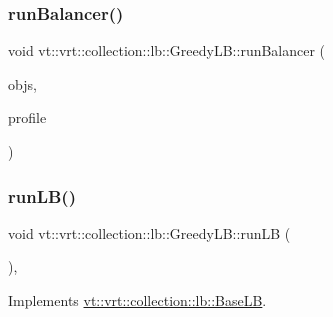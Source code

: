 \subsubsection{\texorpdfstring{run\+Balancer()}{runBalancer()}}
{\footnotesize\ttfamily void vt\+::vrt\+::collection\+::lb\+::\+Greedy\+L\+B\+::run\+Balancer (\begin{DoxyParamCaption}\item[{\hyperlink{structvt_1_1vrt_1_1collection_1_1lb_1_1_base_l_b_a331d7da5bbf2883238427d86b54ddd7b}{Obj\+Sample\+Type} \&\&}]{objs,  }\item[{\hyperlink{structvt_1_1vrt_1_1collection_1_1lb_1_1_greedy_l_b_a3db2c9b36ac99ed4aed38519be4aad60}{Load\+Profile\+Type} \&\&}]{profile }\end{DoxyParamCaption})\hspace{0.3cm}{\ttfamily [private]}}

\mbox{\label{structvt_1_1vrt_1_1collection_1_1lb_1_1_greedy_l_b_ab5e726f6fe7aa749ea6e0e2a45171d36}} 
\subsubsection{\texorpdfstring{run\+L\+B()}{runLB()}}
{\footnotesize\ttfamily void vt\+::vrt\+::collection\+::lb\+::\+Greedy\+L\+B\+::run\+LB (\begin{DoxyParamCaption}{ }\end{DoxyParamCaption})\hspace{0.3cm}{\ttfamily [override]}, {\ttfamily [virtual]}}



Implements \hyperlink{structvt_1_1vrt_1_1collection_1_1lb_1_1_base_l_b_a69a398c54f8129f365171a1189ffcd84}{vt\+::vrt\+::collection\+::lb\+::\+Base\+LB}.

\mbox{\label{structvt_1_1vrt_1_1collection_1_1lb_1_1_greedy_l_b_a329b105a21240dd33a53d06080b035da}} 
